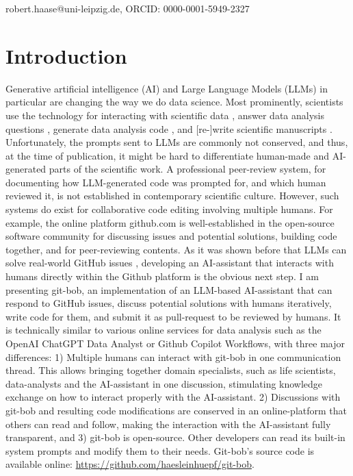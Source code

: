 \documentclass[times, twoside]{zHenriquesLab-StyleBioRxiv}
\begin{document}
\begin{corrauthor}
robert.haase@uni-leipzig.de, ORCID: 0000-0001-5949-2327
\end{corrauthor}



\section*{Introduction}

Generative artificial intelligence (AI) and Large Language Models (LLMs) in particular are changing the way we do data science. Most prominently, scientists use the technology for interacting with scientific data \cite{Royer2023}, answer data analysis questions \cite{Lai2022DS1000, lei2024bioimage}, generate data analysis code \cite{Royer2024, benchmark_llm_bia, chen2021evaluating}, and [re-]write scientific manuscripts \cite{lu2024aiscientist}. Unfortunately, the prompts sent to LLMs are commonly not conserved, and thus, at the time of publication, it might be hard to differentiate human-made and AI-generated parts of the scientific work. A professional peer-review system, for documenting how LLM-generated code was prompted for, and which human reviewed it, is not established in contemporary scientific culture. However, such systems do exist for collaborative code editing involving multiple humans. For example, the online platform github.com is well-established in the open-source software community for discussing issues and potential solutions, building code together, and for peer-reviewing contents. As it was shown before that LLMs can solve real-world GitHub issues \cite{jimenez2024swebenchlanguagemodelsresolve}, developing an AI-assistant that interacts with humans directly within the Github platform is the obvious next step. I am presenting git-bob, an implementation of an LLM-based AI-assistant that can respond to GitHub issues, discuss potential solutions with humans iteratively, write code for them, and submit it as pull-request to be reviewed by humans. It is technically similar to various online services for data analysis such as the OpenAI ChatGPT Data Analyst or Github Copilot Workflows, with three major differences: 1) Multiple humans can interact with git-bob in one communication thread. This allows bringing together domain specialists, such as life scientists, data-analysts and the AI-assistant in one discussion, stimulating knowledge exchange on how to interact properly with the AI-assistant. 2) Discussions with git-bob and resulting code modifications are conserved in an online-platform that others can read and follow, making the interaction with the AI-assistant fully transparent, and 3) git-bob is open-source. Other developers can read its built-in system prompts and modify them to their needs. Git-bob's source code is available online: \url{https://github.com/haesleinhuepf/git-bob}.
\end{document}
